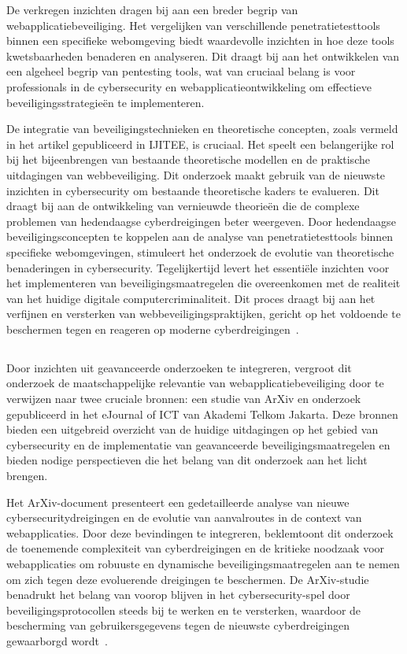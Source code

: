 De verkregen inzichten dragen bij aan een breder begrip van webapplicatiebeveiliging. Het vergelijken van verschillende penetratietesttools binnen een specifieke 
webomgeving biedt waardevolle inzichten in hoe deze tools kwetsbaarheden benaderen en analyseren. Dit draagt bij aan het ontwikkelen van een algeheel begrip van 
pentesting tools, wat van cruciaal belang is voor professionals in de cybersecurity en webapplicatieontwikkeling om effectieve beveiligingsstrategieën te implementeren.

De integratie van beveiligingstechnieken en theoretische concepten, zoals vermeld in het artikel gepubliceerd in IJITEE, is cruciaal. Het speelt een belangerijke rol 
bij het bijeenbrengen van bestaande theoretische modellen en de praktische uitdagingen van webbeveiliging. Dit onderzoek maakt gebruik van de nieuwste inzichten in cybersecurity 
om bestaande theoretische kaders te evalueren. Dit draagt bij aan de ontwikkeling van vernieuwde theorieën die de complexe problemen van hedendaagse 
cyberdreigingen beter weergeven. Door hedendaagse beveiligingsconcepten te koppelen aan de analyse van penetratietesttools binnen specifieke webomgevingen, 
stimuleert het onderzoek de evolutie van theoretische benaderingen in cybersecurity. Tegelijkertijd levert het essentiële inzichten voor het implementeren van beveiligingsmaatregelen
die overeenkomen met de realiteit van het huidige digitale computercriminaliteit.
Dit proces draagt bij aan het verfijnen en versterken van webbeveiligingspraktijken, gericht op het voldoende te beschermen tegen en reageren op moderne 
cyberdreigingen~\autocite{Nagendran2019}.

\subsection{}
Door inzichten uit geavanceerde onderzoeken te integreren, vergroot dit onderzoek de maatschappelijke relevantie van webapplicatiebeveiliging door te verwijzen naar 
twee cruciale bronnen: een studie van ArXiv en onderzoek gepubliceerd in het eJournal of ICT van Akademi Telkom Jakarta. Deze bronnen bieden een uitgebreid overzicht 
van de huidige uitdagingen op het gebied van cybersecurity en de implementatie van geavanceerde beveiligingsmaatregelen en bieden nodige perspectieven die het 
belang van dit onderzoek aan het licht brengen.

Het ArXiv-document presenteert een gedetailleerde analyse van nieuwe cybersecuritydreigingen en de evolutie van aanvalroutes in de context van webapplicaties. 
Door deze bevindingen te integreren, beklemtoont dit onderzoek de toenemende complexiteit van cyberdreigingen en de kritieke noodzaak voor webapplicaties om robuuste 
en dynamische beveiligingsmaatregelen aan te nemen om zich tegen deze evoluerende dreigingen te beschermen. De ArXiv-studie benadrukt het belang van voorop blijven 
in het cybersecurity-spel door beveiligingsprotocollen steeds bij te werken en te versterken, waardoor de bescherming van gebruikersgegevens tegen de nieuwste 
cyberdreigingen gewaarborgd wordt~\autocite{Deng2023}.

